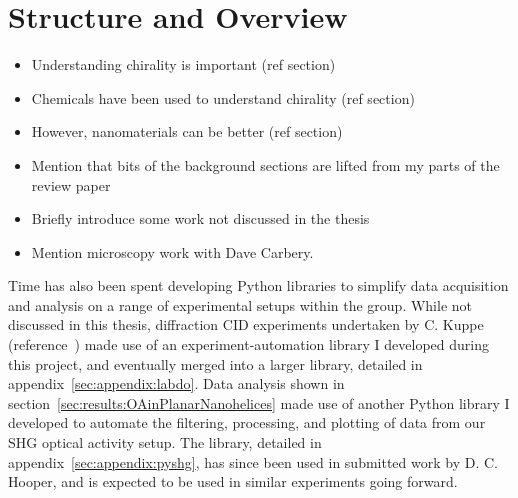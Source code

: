 \chapter{Structure and Overview}\label{sec:background:Introduction}
\color{red}

\begin{itemize}
    \item Understanding chirality is important (ref section)
    \item Chemicals have been used to understand chirality (ref section)
    \item However, nanomaterials can be better (ref section)
    \item Mention that bits of the background sections are lifted from my parts of the review paper
    \item Briefly introduce some work not discussed in the thesis
    \item Mention microscopy work with Dave Carbery.
\end{itemize}
\color{black}

Time has also been spent developing Python libraries to simplify data acquisition and analysis on a range of experimental setups within the group. While not discussed in this thesis, diffraction CID experiments undertaken by C. Kuppe (reference~\cite{Kuppe2018}) made use of an experiment-automation library I developed during this project, and eventually merged into a larger library, detailed in appendix~\ref{sec:appendix:labdo}. Data analysis shown in section~\ref{sec:results:OAinPlanarNanohelices} made use of another Python library I developed to automate the filtering, processing, and plotting of data from our SHG optical activity setup. The library, detailed in appendix~\ref{sec:appendix:pyshg}, has since been used in submitted work by D. C. Hooper, and is expected to be used in similar experiments going forward.